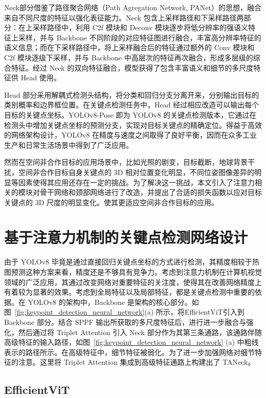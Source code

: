 Neck部分借鉴了路径聚合网络（Path Agregation Network, PANet）\cite{panet}的思想，融合来自不同尺度的特征以强化表征能力。Neck 包含上采样路径和下采样路径两部分：在上采样路径中，利用 C2f 模块和 Deconv 模块逐步将低分辨率的强语义特征上采样，并与 Backbone 不同阶段的对应特征图进行融合，丰富高分辨率特征的语义信息；而在下采样路径中，将上采样融合后的特征通过额外的 Conv 模块和 C2f 模块逐级下采样，并与 Backbone 中高层次的特征再次融合，形成多层级的综合特征。经过 Neck 的双向特征融合，模型获得了包含丰富语义和细节的多尺度特征供 Head 使用。 

Head 部分采用解耦式检测头结构，将分类和回归分支分离开来，分别输出目标的类别概率和边界框位置。在关键点检测任务中，Head 经过相应改造可以输出每个目标的关键点坐标。YOLOv8-Pose 即为 YOLOv8 的关键点检测版本，它通过在检测头中增加关键点坐标的预测分支，实现对目标关键点的精确定位。得益于高效的网络架构设计，YOLOv8 在精度与速度之间取得了良好平衡，因而在众多工业生产和日常生活场景中得到了广泛应用\cite{sohan2024review,s23167190,ani14121791,Dong2024,yuan2024yolov8}。

然而在空间非合作目标的应用场景中，比如光照的剧变，目标截断，地球背景干扰，空间非合作目标自身关键点的 3D 相对位置变化明显，不同位姿图像差异的明显等因素使得其应用还存在一定的挑战。为了解决这一挑战，本文引入了注意力相关的模块对骨干网络和颈部网络进行了改造，并提出了合适的损失函数以应对目标关键点的 3D 尺度的明显变化。使其更适应空间非合作目标的应用。


\section{基于注意力机制的关键点检测网络设计}
由于 YOLOv8 毕竟是通过直接回归关键点坐标的方式进行检测，其精度相较于热图预测这种方案来看，精度还是不够具有竞争力。考虑到注意力机制在计算机视觉领域的广泛应用，其通过改变网络对重要特征的关注度，使得其在改善网络精度上有着较为显著的效果。考虑到全局特征以及局部特征，都是关键点检测中重要的依据。在 YOLOv8 的架构中，Backbone 是架构的核心部分。如图~\ref{fig:keypoint_detection_neural_network}(a) 所示，将EfficientViT引入到 Backbone 部分。结合 SPPF 输出所获取的多尺度特征后，进行进一步融合与强化，然后通过将 Triplet Attention 引入 Neck 部分作为其第三条通路，该通路伴随高级特征的输入路径，如图~\ref{fig:keypoint_detection_neural_network} (a) 中粗线表示的路径所示。在高级特征中，细节特征被弱化。为了进一步加强网络对细节特征的注意。这里将 Triplet Attention 集成到高级特征通路上构建出了 TANeck。

\subsection{EfficientViT}

